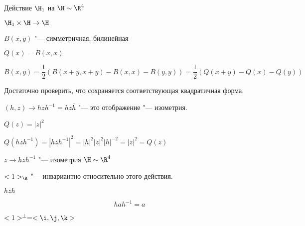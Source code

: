 Действие $\H_1$ на $\H \sim \R^4$

$\H_1 \times \H \to \H$

$B(x, y)$ "--- симметричная, билинейная 

$Q(x) = B(x, x)$

$$B(x, y) = \frac{1}{2}(B(x + y, x + y) - B(x, x) - B(y, y)) = \frac{1}{2}(Q(x + y) - Q(x) - Q(y))$$

Достаточно проверить, что сохраняется соответствующая квадратичная форма. 

$(h, z) \to hzh^{-1}  = hz\bar h$  "--- это отображение "--- изометрия. 

$Q(z) = |z|^2$

$Q(hzh^{-1}) = |hzh^{-1}|^2 = |h|^2|z|^2|h|^{-2} = |z|^2 = Q(z)$ 

$z \to hzh^{-1}$ "--- изометрия $\H \sim \R^4$

$<1>_{\R}$ "--- инвариантно относительно этого действия. 

$hzh$

$$hah^{-1} = a$$

$<1>^{\bot} = <\i, \j, \k>$